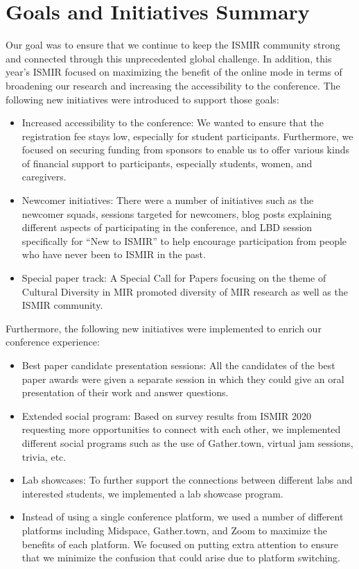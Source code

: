 \documentclass[%
10pt,								%
]
{scrartcl}
\begin{document}
\section{Goals and Initiatives Summary}
    Our goal was to ensure that we continue to keep the ISMIR community strong and connected through this unprecedented global challenge. In addition, this year’s ISMIR focused on maximizing the benefit of the online mode in terms of broadening our research and increasing the accessibility to the conference. The following new initiatives were introduced to support those goals: 
    \begin{itemize}
        \item   Increased accessibility to the conference: We wanted to ensure that the registration fee stays low, especially for student participants. Furthermore, we focused on securing funding from sponsors to enable us to offer various kinds of financial support to participants, especially students, women, and caregivers. 
        \item   Newcomer initiatives: There were a number of initiatives such as the newcomer squads, sessions targeted for newcomers, blog posts explaining different aspects of participating in the conference, and LBD session specifically for ``New to ISMIR'' to help encourage participation from people who have never been to ISMIR in the past. 
        \item   Special paper track: A Special Call for Papers focusing on the theme of Cultural Diversity in MIR promoted diversity of MIR research as well as the ISMIR community. 
    \end{itemize}

    Furthermore, the following new initiatives were implemented to enrich our conference experience:
    \begin{itemize}
        \item   Best paper candidate presentation sessions: All the candidates of the best paper awards were given a separate session in which they could give an oral presentation of their work and answer questions.
        \item   Extended social program: Based on survey results from ISMIR 2020 requesting more opportunities to connect with each other, we implemented different social programs such as the use of Gather.town, virtual jam sessions, trivia, etc.
        \item   Lab showcases: To further support the connections between different labs and interested students, we implemented a lab showcase program.
        \item   Instead of using a single conference platform, we used a number of different platforms including Midspace, Gather.town, and Zoom to maximize the benefits of each platform. We focused on putting extra attention to ensure that we minimize the confusion that could arise due to platform switching. 
    \end{itemize}
    
\end{document}
